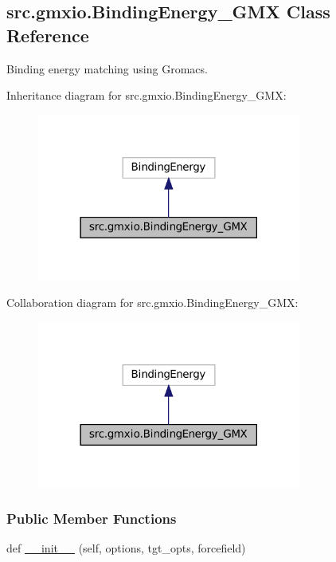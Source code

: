 \hypertarget{classsrc_1_1gmxio_1_1BindingEnergy__GMX}{}\subsection{src.\+gmxio.\+Binding\+Energy\+\_\+\+G\+MX Class Reference}
\label{classsrc_1_1gmxio_1_1BindingEnergy__GMX}


Binding energy matching using Gromacs.  




Inheritance diagram for src.\+gmxio.\+Binding\+Energy\+\_\+\+G\+MX\+:
\nopagebreak
\begin{figure}[H]
\begin{center}
\leavevmode
\includegraphics[width=246pt]{classsrc_1_1gmxio_1_1BindingEnergy__GMX__inherit__graph}
\end{center}
\end{figure}


Collaboration diagram for src.\+gmxio.\+Binding\+Energy\+\_\+\+G\+MX\+:
\nopagebreak
\begin{figure}[H]
\begin{center}
\leavevmode
\includegraphics[width=246pt]{classsrc_1_1gmxio_1_1BindingEnergy__GMX__coll__graph}
\end{center}
\end{figure}
\subsubsection*{Public Member Functions}
\begin{DoxyCompactItemize}
\item 
def \hyperlink{classsrc_1_1gmxio_1_1BindingEnergy__GMX_aa83b6a721eff58cbee1c1067e13ea297}{\+\_\+\+\_\+init\+\_\+\+\_\+} (self, options, tgt\+\_\+opts, forcefield)
\end{DoxyCompactItemize}
